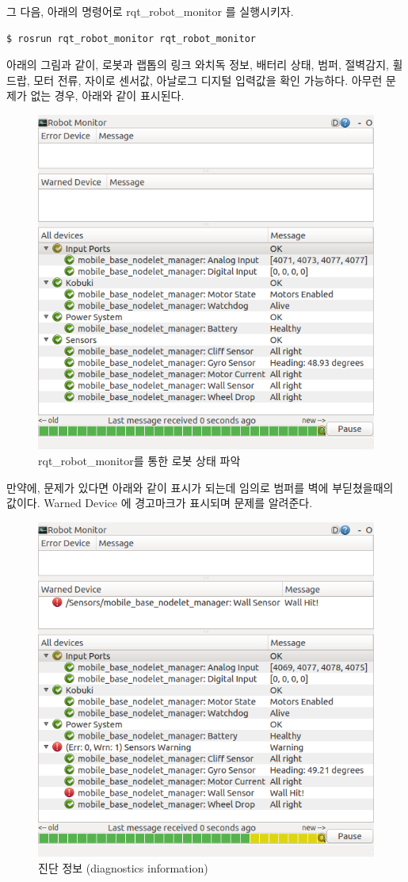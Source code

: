 \noindent
그 다음, 아래의 명령어로 rqt\_robot\_monitor 를 실행시키자.

\vspace{\baselineskip}
\begin{lstlisting}[language=ROS]
$ rosrun rqt_robot_monitor rqt_robot_monitor
\end{lstlisting}


아래의 그림과 같이, 로봇과 랩톱의 링크 와치독 정보, 배터리 상태, 범퍼, 절벽감지, 휠 드랍, 모터 전류, 자이로 센서값, 아날로그 디지털 입력값을 확인 가능하다. 아무런 문제가 없는 경우, 아래와 같이 표시된다.

\begin{figure}[h]
\centering\includegraphics[width=0.8\columnwidth]{pictures/chapter10/rqt_robot_monitor.png}
\caption{rqt\_robot\_monitor를 통한 로봇 상태 파악}
\end{figure}

만약에, 문제가 있다면 아래와 같이 표시가 되는데 임의로 범퍼를 벽에 부딛쳤을때의 값이다. Warned Device 에 경고마크가 표시되며 문제를 알려준다.

\begin{figure}[h]
\centering\includegraphics[width=0.8\columnwidth]{pictures/chapter10/diagnostics_warning.png}
\caption{진단 정보 (diagnostics information)}
\end{figure}

